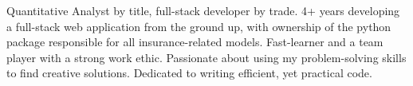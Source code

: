 \documentclass[9pt]{developercv} %
\begin{document}
\vspace{0.25cm}



\begin{minipage}[t]{0.50\textwidth} %
	\vspace{-\baselineskip} %
	\vspace{0pt} 
	Quantitative Analyst by title, full-stack developer by trade.
	4+ years developing a full-stack web application from the ground up, with ownership of the python package responsible for all insurance-related models.
	Fast-learner and a team player with a strong work ethic.
	Passionate about using my problem-solving skills to find creative solutions.
	Dedicated to writing efficient, yet practical code.
\end{minipage}
\hspace{0.5cm} %
\begin{minipage}[t]{0.50\textwidth} %
	\vspace{-31pt}
	\vspace{-\baselineskip} %
	\begin{barchart}{5}
	\end{barchart}
\end{minipage}

\vspace{0.25cm}

\vspace{-6pt}
\end{document}
